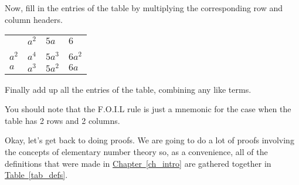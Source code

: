 \documentclass[10pt,]{book}
\theoremstyle{plain}
\theoremstyle{definition}
\theoremstyle{definition}
\numberwithin{equation}{section}
\newcommand{\hrulethin}  {\noalign{\hrule height 0.04em}}
\begin{document}
    Now, fill in the entries of the table by multiplying the corresponding
    row and column headers.
\begin{tabular}{llll}
&\(a^2\)&\(5a\)&\(6\)\tabularnewline[0pt]
&&&\tabularnewline\hrulethin
\(a^2\)&\(a^4\)&\(5a^3\)&\(6a^2\)\tabularnewline[0pt]
\(a\)&\(a^3\)&\(5a^2\)&\(6a\)
\end{tabular}
\par

    Finally add up all the entries of the table, combining any like terms.
\par

    You should note that the F.O.I.L rule is just a mnemonic for the case when
    the table has 2 rows and 2 columns.
\par

    Okay, let's get back to doing proofs. We are going to do a lot of
    proofs involving the concepts of elementary number theory so, as a
    convenience, all of the definitions that were made in \hyperref[ch_intro]{Chapter~\ref{ch_intro}}
    are gathered together in \hyperref[tab_defs]{Table~\ref{tab_defs}}.
\leavevmode%
\end{document}
